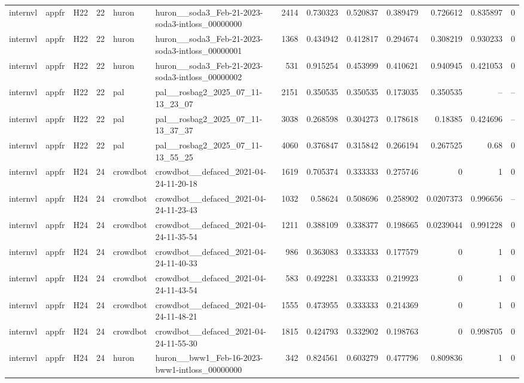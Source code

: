 \begin{longtable}{lllrllrrrrrrr}
internvl & appfr & H22 & 22 & huron & huron\_\_soda3\_Feb-21-2023-soda3-intloss\_00000000 & 2414 & 0.730323 & 0.520837 & 0.389479 & 0.726612 & 0.835897 & 0 \\
internvl & appfr & H22 & 22 & huron & huron\_\_soda3\_Feb-21-2023-soda3-intloss\_00000001 & 1368 & 0.434942 & 0.412817 & 0.294674 & 0.308219 & 0.930233 & 0 \\
internvl & appfr & H22 & 22 & huron & huron\_\_soda3\_Feb-21-2023-soda3-intloss\_00000002 & 531 & 0.915254 & 0.453999 & 0.410621 & 0.940945 & 0.421053 & 0 \\
internvl & appfr & H22 & 22 & pal & pal\_\_rosbag2\_2025\_07\_11-13\_23\_07 & 2151 & 0.350535 & 0.350535 & 0.173035 & 0.350535 & -- & -- \\
internvl & appfr & H22 & 22 & pal & pal\_\_rosbag2\_2025\_07\_11-13\_37\_37 & 3038 & 0.268598 & 0.304273 & 0.178618 & 0.18385 & 0.424696 & -- \\
internvl & appfr & H22 & 22 & pal & pal\_\_rosbag2\_2025\_07\_11-13\_55\_25 & 4060 & 0.376847 & 0.315842 & 0.266194 & 0.267525 & 0.68 & 0 \\
internvl & appfr & H24 & 24 & crowdbot & crowdbot\_\_defaced\_2021-04-24-11-20-18 & 1619 & 0.705374 & 0.333333 & 0.275746 & 0 & 1 & 0 \\
internvl & appfr & H24 & 24 & crowdbot & crowdbot\_\_defaced\_2021-04-24-11-23-43 & 1032 & 0.58624 & 0.508696 & 0.258902 & 0.0207373 & 0.996656 & -- \\
internvl & appfr & H24 & 24 & crowdbot & crowdbot\_\_defaced\_2021-04-24-11-35-54 & 1211 & 0.388109 & 0.338377 & 0.198665 & 0.0239044 & 0.991228 & 0 \\
internvl & appfr & H24 & 24 & crowdbot & crowdbot\_\_defaced\_2021-04-24-11-40-33 & 986 & 0.363083 & 0.333333 & 0.177579 & 0 & 1 & 0 \\
internvl & appfr & H24 & 24 & crowdbot & crowdbot\_\_defaced\_2021-04-24-11-43-54 & 583 & 0.492281 & 0.333333 & 0.219923 & 0 & 1 & 0 \\
internvl & appfr & H24 & 24 & crowdbot & crowdbot\_\_defaced\_2021-04-24-11-48-21 & 1555 & 0.473955 & 0.333333 & 0.214369 & 0 & 1 & 0 \\
internvl & appfr & H24 & 24 & crowdbot & crowdbot\_\_defaced\_2021-04-24-11-55-30 & 1815 & 0.424793 & 0.332902 & 0.198763 & 0 & 0.998705 & 0 \\
internvl & appfr & H24 & 24 & huron & huron\_\_bww1\_Feb-16-2023-bww1-intloss\_00000000 & 342 & 0.824561 & 0.603279 & 0.477796 & 0.809836 & 1 & 0 \\

\end{longtable}
